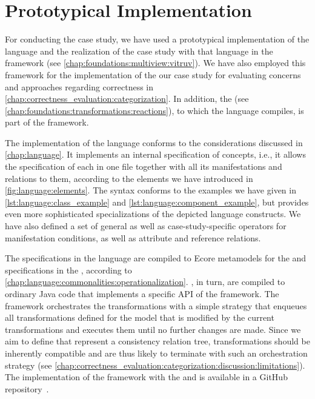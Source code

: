 \section{Prototypical Implementation}

For conducting the case study, we have used a prototypical implementation of the \commonalities language and the realization of the case study with that language in the \vitruv framework (see \autoref{chap:foundations:multiview:vitruv}).
We have also employed this framework for the implementation of the our case study for evaluating concerns and approaches regarding correctness in \autoref{chap:correctness_evaluation:categorization}.
In addition, the \reactionslanguage (see \autoref{chap:foundations:transformations:reactions}), to which the \commonalities language compiles, is part of the \vitruv framework.

The implementation of the \commonalities language conforms to the considerations discussed in \autoref{chap:language}.
It implements an internal specification of concepts, i.e., it allows the specification of each \commonality in one file together with all its manifestations and relations to them, according to the elements we have introduced in \autoref{fig:language:elements}.
The syntax conforms to the examples we have given in \autoref{lst:language:class_example} and \autoref{lst:language:component_example}, but provides even more sophisticated specializations of the depicted language constructs.
We have also defined a set of general as well as case-study-specific operators for manifestation conditions, as well as attribute and reference relations.

The specifications in the \commonalities language are compiled to Ecore metamodels for the \conceptmetamodels and specifications in the \reactionslanguage, according to \autoref{chap:language:commonalities:operationalization}.
\reactions, in turn, are compiled to ordinary Java code that implements a specific \gls{API} of the \vitruv framework.
The framework orchestrates the transformations with a simple strategy that enqueues all transformations defined for the model that is modified by the current transformations and executes them until no further changes are made.
Since we aim to define \commonalities that represent a consistency relation tree, transformations should be inherently compatible and are thus likely to terminate with such an orchestration strategy (see \autoref{chap:correctness_evaluation:categorization:discussion:limitations}).
The implementation of the framework with the \commonalities and \reactionslanguage is available in a GitHub repository~.


